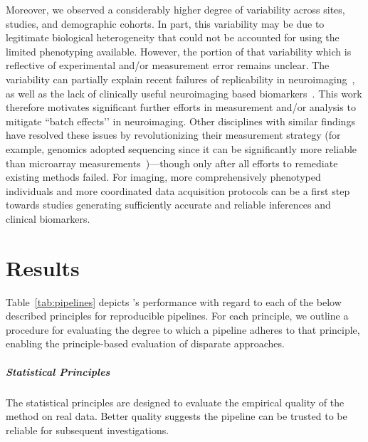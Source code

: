 \documentclass[11pt]{article}
\begin{document}
\begin{multicols}{2}
Moreover, we observed a considerably higher degree of variability across sites, studies, and demographic cohorts.
In part, this variability may be due to legitimate biological heterogeneity that could not be accounted for using the limited phenotyping available.
However, the portion of that variability which is reflective of experimental and/or measurement error remains unclear.
The variability can partially explain recent failures of replicability in neuroimaging~\cite{Button2013}, as well as the lack of clinically useful neuroimaging based biomarkers~\cite{APA12}.
This work therefore motivates significant further efforts in measurement and/or analysis to mitigate ``batch effects’’ in neuroimaging.
Other disciplines with similar findings have resolved these issues by revolutionizing their measurement strategy (for example, genomics adopted sequencing since it can be significantly more reliable than microarray measurements~\cite{SEQCMAQC-III_Consortium2014-ij})---though only after all efforts to remediate existing methods failed.
For imaging, more comprehensively phenotyped individuals and more coordinated data acquisition protocols can be a first step towards studies generating sufficiently accurate and reliable inferences and clinical biomarkers.



%

\section{Results}

Table~\ref{tab:pipelines} depicts \ndmg's performance with regard to each of the below described principles for reproducible pipelines.  
For each principle, we outline a procedure for evaluating the degree to which a pipeline adheres to that principle, enabling the principle-based evaluation of disparate approaches. 

\subparagraph*{Statistical Principles}
The statistical principles are designed to evaluate the empirical quality of the method on real data. Better quality suggests the pipeline can be trusted to be reliable for subsequent investigations. 


\end{multicols}
\end{document}
